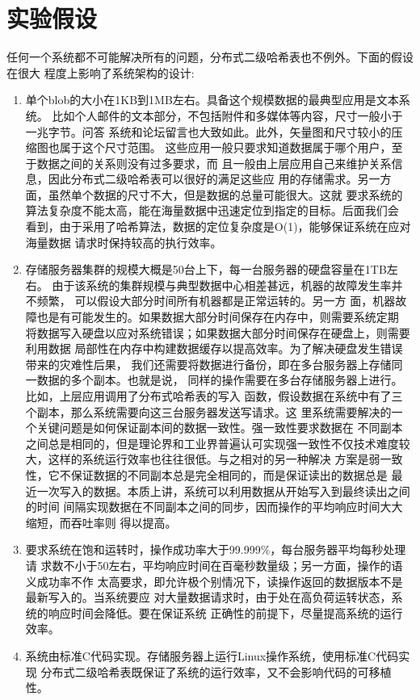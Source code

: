 \section{实验假设}\label{section:assumption}
任何一个系统都不可能解决所有的问题，分布式二级哈希表也不例外。下面的假设在很大
程度上影响了系统架构的设计:
\begin{enumerate}
  \item 单个blob的大小在1KB到1MB左右。具备这个规模数据的最典型应用是文本系统。
  比如个人邮件的文本部分，不包括附件和多媒体等内容，尺寸一般小于一兆字节。问答
  系统和论坛留言也大致如此。此外，矢量图和尺寸较小的压缩图也属于这个尺寸范围。
  这些应用一般只要求知道数据属于哪个用户，至于数据之间的关系则没有过多要求，而
  且一般由上层应用自己来维护关系信息，因此分布式二级哈希表可以很好的满足这些应
  用的存储需求。另一方面，虽然单个数据的尺寸不大，但是数据的总量可能很大。这就
  要求系统的算法复杂度不能太高，能在海量数据中迅速定位到指定的目标。后面我们会
  看到，由于采用了哈希算法，数据的定位复杂度是O(1)，能够保证系统在应对海量数据
  请求时保持较高的执行效率。
  \item 存储服务器集群的规模大概是50台上下，每一台服务器的硬盘容量在1TB左右。
  由于该系统的集群规模与典型数据中心相差甚远，机器的故障发生率并不频繁，
  \cite{hastorun2007dynamo}可以假设大部分时间所有机器都是正常运转的。另一方
  面，机器故障也是有可能发生的。如果数据大部分时间保存在内存中，则需要系统定期
  将数据写入硬盘以应对系统错误；如果数据大部分时间保存在硬盘上，则需要利用数据
  局部性在内存中构建数据缓存以提高效率。为了解决硬盘发生错误带来的灾难性后果，
  我们还需要将数据进行备份，即在多台服务器上存储同一数据的多个副本。也就是说，
  同样的操作需要在多台存储服务器上进行。比如，上层应用调用了分布式哈希表的写入
  函数，假设数据在系统中有了三个副本，那么系统需要向这三台服务器发送写请求。这
  里系统需要解决的一个关键问题是如何保证副本间的数据一致性。强一致性要求数据在
  不同副本之间总是相同的，但是理论界和工业界普遍认可实现强一致性不仅技术难度较
  大，这样的系统运行效率也往往很低。\cite{fox1997cluster}与之相对的另一种解决
  方案是弱一致性，它不保证数据的不同副本总是完全相同的，而是保证读出的数据总是
  最近一次写入的数据。本质上讲，系统可以利用数据从开始写入到最终读出之间的时间
  间隔实现数据在不同副本之间的同步，因而操作的平均响应时间大大缩短，而吞吐率则
  得以提高。
  \item 要求系统在饱和运转时，操作成功率大于99.999\%，每台服务器平均每秒处理请
  求数不小于50左右，平均响应时间在百毫秒数量级；另一方面，操作的语义成功率不作
  太高要求，即允许极个别情况下，读操作返回的数据版本不是最新写入的。当系统要应
  对大量数据请求时，由于处在高负荷运转状态，系统的响应时间会降低。要在保证系统
  正确性的前提下，尽量提高系统的运行效率。
  \item 系统由标准C代码实现。存储服务器上运行Linux操作系统，使用标准C代码实现
  分布式二级哈希表既保证了系统的运行效率，又不会影响代码的可移植性。
  
\end{enumerate}
